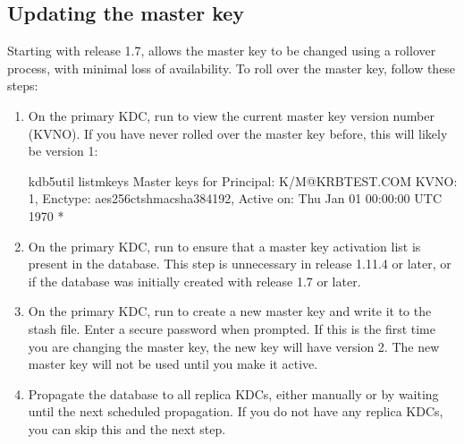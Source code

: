 \documentclass[letterpaper,10pt,english]{sphinxmanual}
\begin{document}
\subsection{Updating the master key}
\label{\detokenize{admin/database:updating-the-master-key}}\label{\detokenize{admin/database:updating-master-key}}
\sphinxAtStartPar
Starting with release 1.7, {\hyperref[\detokenize{admin/admin_commands/kdb5_util:kdb5-util-8}]{}} allows the master key
to be changed using a rollover process, with minimal loss of
availability.  To roll over the master key, follow these steps:
\begin{enumerate}
%
\item {} 
\sphinxAtStartPar
On the primary KDC, run  to view the
current master key version number (KVNO).  If you have never rolled
over the master key before, this will likely be version 1:

\begin{sphinxVerbatim}[commandchars=\\\{\}]
\PYGZdl{} kdb5\PYGZus{}util list\PYGZus{}mkeys
Master keys for Principal: K/M@KRBTEST.COM
KVNO: 1, Enctype: aes256\PYGZhy{}cts\PYGZhy{}hmac\PYGZhy{}sha384\PYGZhy{}192, Active on: Thu Jan 01 00:00:00 UTC 1970 *
\end{sphinxVerbatim}

\item {} 
\sphinxAtStartPar
On the primary KDC, run  to ensure that a
master key activation list is present in the database.  This step
is unnecessary in release 1.11.4 or later, or if the database was
initially created with release 1.7 or later.

\item {} 
\sphinxAtStartPar
On the primary KDC, run  to create a new
master key and write it to the stash file.  Enter a secure password
when prompted.  If this is the first time you are changing the
master key, the new key will have version 2.  The new master key
will not be used until you make it active.

\item {} 
\sphinxAtStartPar
Propagate the database to all replica KDCs, either manually or by
waiting until the next scheduled propagation.  If you do not have
any replica KDCs, you can skip this and the next step.


\end{enumerate}
\end{document}
